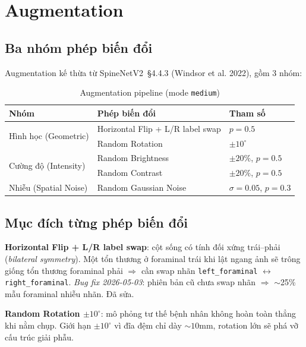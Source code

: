 \documentclass[11pt,a4paper]{article}
\begin{document}
\section{Augmentation}

\subsection{Ba nhóm phép biến đổi}

\noindent Augmentation kế thừa từ SpineNetV2~\S4.4.3 (Windsor et al. 2022),
gồm 3 nhóm:

\begin{table}[h]
\centering
\caption{Augmentation pipeline (mode \texttt{medium})}
\begin{tabular}{@{}lll@{}}
\toprule
\rowcolor{tablehdr}
Nhóm & Phép biến đổi & Tham số \\
\midrule
\multirow{2}{*}{Hình học (Geometric)}
 & Horizontal Flip + L/R label swap & $p = 0.5$ \\
 & Random Rotation                   & $\pm 10^{\circ}$ \\
\midrule
\multirow{2}{*}{Cường độ (Intensity)}
 & Random Brightness                 & $\pm 20\%$, $p = 0.5$ \\
 & Random Contrast                   & $\pm 20\%$, $p = 0.5$ \\
\midrule
Nhiễu (Spatial Noise)
 & Random Gaussian Noise             & $\sigma = 0.05$, $p = 0.3$ \\
\bottomrule
\end{tabular}
\end{table}

\subsection{Mục đích từng phép biến đổi}

\noindent\textbf{Horizontal Flip + L/R label swap}: cột sống có tính
đối xứng trái--phải (\textit{bilateral symmetry}). Một tổn thương ở
foraminal trái khi lật ngang ảnh sẽ trông giống tổn thương foraminal
phải $\Rightarrow$ cần swap nhãn \verb|left_foraminal| $\leftrightarrow$
\verb|right_foraminal|. \emph{Bug fix 2026-05-03}: phiên bản cũ chưa swap
nhãn $\Rightarrow$ $\sim$25\% mẫu foraminal nhiễu nhãn. Đã sửa.

\noindent\textbf{Random Rotation $\pm 10^{\circ}$}: mô phỏng tư thế bệnh
nhân không hoàn toàn thẳng khi nằm chụp. Giới hạn $\pm 10^{\circ}$ vì
đĩa đệm chỉ dày $\sim 10$mm, rotation lớn sẽ phá vỡ cấu trúc giải phẫu.
\end{document}
